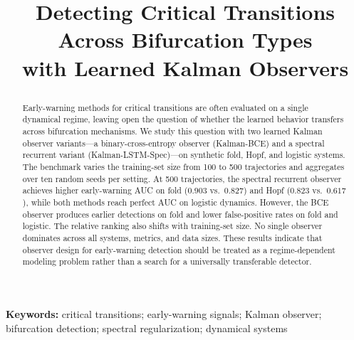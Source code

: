 \documentclass[11pt]{article}
\title{Detecting Critical Transitions Across Bifurcation Types \\ with Learned Kalman Observers

}
\author{}
\date{}
\theoremstyle{remark}
\begin{document}
\maketitle

\begin{abstract}
Early-warning methods for critical transitions are often evaluated on a
single dynamical regime, leaving open the question of whether the learned
behavior transfers across bifurcation mechanisms. We study this question
with two learned Kalman observer variants---a binary-cross-entropy observer
(Kalman-BCE) and a spectral recurrent variant (Kalman-LSTM-Spec)---on
synthetic fold, Hopf, and logistic systems. The benchmark varies the
training-set size from 100 to 500 trajectories and aggregates over ten
random seeds per setting. At 500 trajectories, the spectral recurrent
observer achieves higher early-warning AUC on fold ($0.903$ vs.\ $0.827$)
and Hopf ($0.823$ vs.\ $0.617$), while both methods reach perfect AUC on
logistic dynamics. However, the BCE observer produces earlier detections on
fold and lower false-positive rates on fold and logistic. The relative
ranking also shifts with training-set size. No single observer dominates
across all systems, metrics, and data sizes. These results indicate that
observer design for early-warning detection should be treated as a
regime-dependent modeling problem rather than a search for a universally
transferable detector.
\end{abstract}

\noindent\textbf{Keywords:} critical transitions; early-warning signals; Kalman observer; bifurcation detection; spectral regularization; dynamical systems











\appendix


\clearpage


\end{document}
